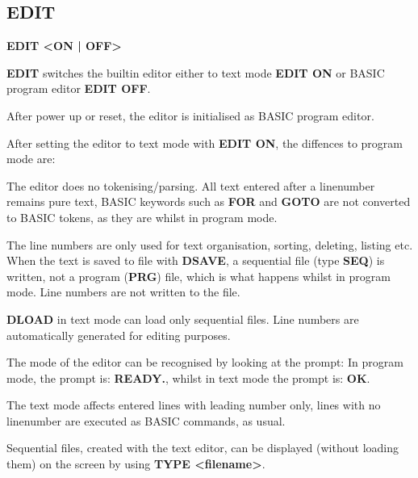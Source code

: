 \subsection{EDIT}
\begin{description}[leftmargin=2cm,style=nextline]
\item [Format:] {\bf EDIT <ON | OFF>}

\item [Usage:]  {\bf EDIT} switches the builtin editor
               either to text mode {\bf EDIT ON}
               or BASIC program editor {\bf EDIT OFF}.

               After power up or reset, the editor
               is initialised as BASIC program editor.

               After setting the editor to text mode with
               {\bf EDIT ON}, the diffences to program mode are:

               The editor does no tokenising/parsing.
               All text entered after a linenumber remains pure text,
               BASIC keywords such as {\bf FOR} and {\bf GOTO} are not
               converted to BASIC tokens, as they are whilst in program mode.

               The line numbers are only used for text organisation,
               sorting, deleting, listing etc.
               When the text is saved to file with {\bf DSAVE},
               a sequential file (type {\bf SEQ}) is written, not a
               program ({\bf PRG}) file, which is what happens whilst in program mode.
               Line numbers are not written to the file.

               {\bf DLOAD} in text mode can load only sequential files.
               Line numbers are automatically generated for editing purposes.

               The mode of the editor can be recognised by looking at the prompt:
               In program mode, the prompt is: {\bf READY.}, whilst in text mode
               the prompt is: {\bf OK}.

               The text mode affects entered lines with leading number only,
               lines with no linenumber are executed as BASIC commands,
               as usual.

               Sequential files, created with the text editor, can be displayed
               (without loading them)
               on the screen by using {\bf TYPE <filename>}.


\end{description}

